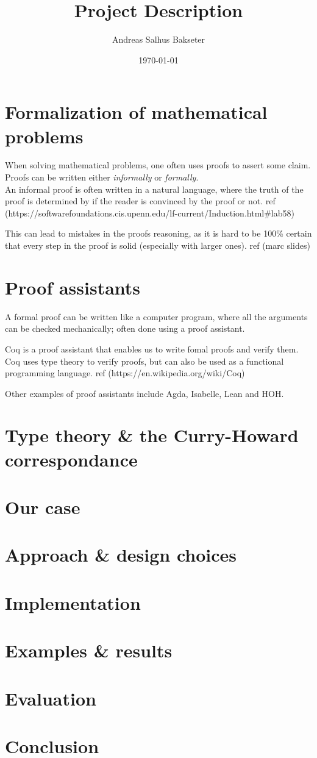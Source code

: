 \documentclass[a4paper,14pt]{article}
\title{Project Description}
\author{Andreas Salhus Bakseter}
\date{\today}
\begin{document}
\maketitle

\section{Formalization of mathematical problems}

When solving mathematical problems, one often uses proofs
to assert some claim. Proofs can be written either \textit{informally} or \textit{formally}.
\\

An informal proof is often written in a natural language, where the truth
of the proof is determined by if the reader is convinced by the proof or not.
ref (https://softwarefoundations.cis.upenn.edu/lf-current/Induction.html#lab58)

This can lead to mistakes in the proofs reasoning, as it is hard to be 100\%
certain that every step in the proof is solid (especially with larger ones).
ref (marc slides)


\section{Proof assistants}

A formal proof can be written like a computer program, where all the
arguments can be checked mechanically; often done using a proof assistant.

Coq is a proof assistant that enables us to write fomal proofs and verify them.
Coq uses type theory to verify proofs, but can also be used as a functional programming language.
ref (https://en.wikipedia.org/wiki/Coq)

Other examples of proof assistants include Agda, Isabelle, Lean and HOH.

\section{Type theory \& the Curry-Howard correspondance}



\section{Our case}

\section{Approach \& design choices}

\section{Implementation}

\section{Examples \& results}

\section{Evaluation}

\section{Conclusion}
\end{document}

